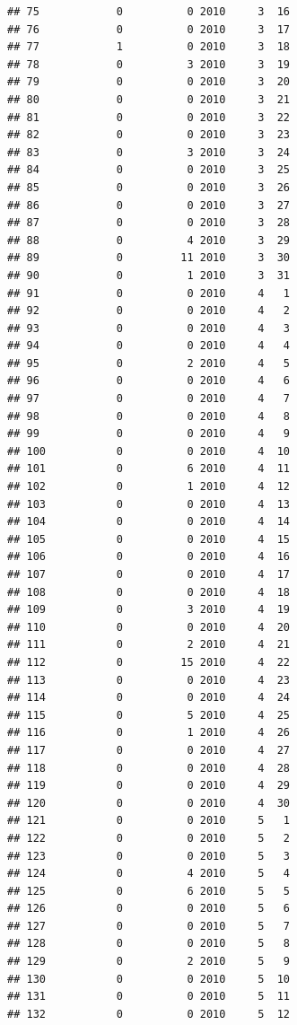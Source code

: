 \documentclass[
]{article}
\begin{document}
\begin{verbatim}
## 75            0          0 2010     3  16
## 76            0          0 2010     3  17
## 77            1          0 2010     3  18
## 78            0          3 2010     3  19
## 79            0          0 2010     3  20
## 80            0          0 2010     3  21
## 81            0          0 2010     3  22
## 82            0          0 2010     3  23
## 83            0          3 2010     3  24
## 84            0          0 2010     3  25
## 85            0          0 2010     3  26
## 86            0          0 2010     3  27
## 87            0          0 2010     3  28
## 88            0          4 2010     3  29
## 89            0         11 2010     3  30
## 90            0          1 2010     3  31
## 91            0          0 2010     4   1
## 92            0          0 2010     4   2
## 93            0          0 2010     4   3
## 94            0          0 2010     4   4
## 95            0          2 2010     4   5
## 96            0          0 2010     4   6
## 97            0          0 2010     4   7
## 98            0          0 2010     4   8
## 99            0          0 2010     4   9
## 100           0          0 2010     4  10
## 101           0          6 2010     4  11
## 102           0          1 2010     4  12
## 103           0          0 2010     4  13
## 104           0          0 2010     4  14
## 105           0          0 2010     4  15
## 106           0          0 2010     4  16
## 107           0          0 2010     4  17
## 108           0          0 2010     4  18
## 109           0          3 2010     4  19
## 110           0          0 2010     4  20
## 111           0          2 2010     4  21
## 112           0         15 2010     4  22
## 113           0          0 2010     4  23
## 114           0          0 2010     4  24
## 115           0          5 2010     4  25
## 116           0          1 2010     4  26
## 117           0          0 2010     4  27
## 118           0          0 2010     4  28
## 119           0          0 2010     4  29
## 120           0          0 2010     4  30
## 121           0          0 2010     5   1
## 122           0          0 2010     5   2
## 123           0          0 2010     5   3
## 124           0          4 2010     5   4
## 125           0          6 2010     5   5
## 126           0          0 2010     5   6
## 127           0          0 2010     5   7
## 128           0          0 2010     5   8
## 129           0          2 2010     5   9
## 130           0          0 2010     5  10
## 131           0          0 2010     5  11
## 132           0          0 2010     5  12

\end{verbatim}
\end{document}
